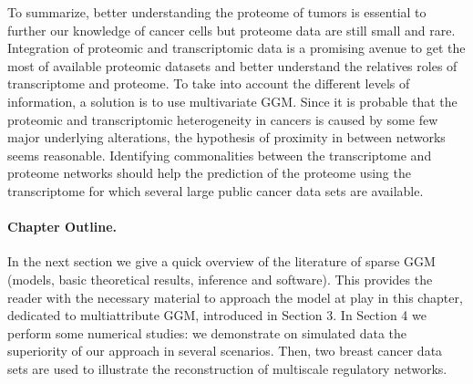 To summarize, better understanding the proteome of tumors is essential
to further our knowledge of cancer cells but proteome data are still
small and rare.  Integration of proteomic and transcriptomic data is a
promising avenue to get the most of available proteomic datasets and
better understand the relatives roles of transcriptome and proteome.
To take into account the different levels of information, a solution
is to use multivariate GGM. Since it is probable that the proteomic
and transcriptomic heterogeneity in cancers is caused by some few
major underlying alterations, the hypothesis of proximity in between
networks seems reasonable.  Identifying commonalities between the
transcriptome and proteome networks should help the prediction of the
proteome using the transcriptome for which several large public cancer
data sets are available.

\paragraph*{Chapter Outline.} In the next section we give a 
quick overview of the literature of sparse GGM (models, basic
theoretical results, inference and software). This provides the reader
with the necessary material to approach the model at play in this
chapter, dedicated to multiattribute GGM, introduced in Section 3. In
Section 4 we perform some numerical studies: we demonstrate on
simulated data the superiority of our approach in several
scenarios. Then, two breast cancer data sets are used to illustrate
the reconstruction of multiscale regulatory networks.
